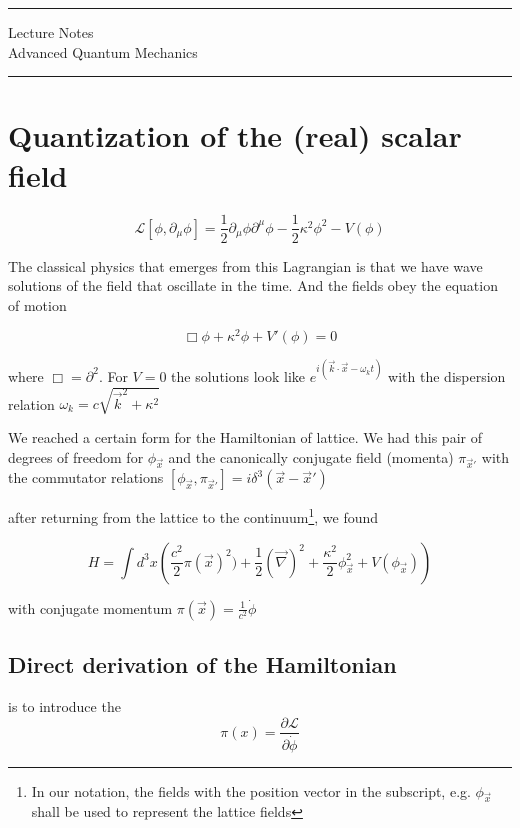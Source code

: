 \documentclass[11pt]{article}
\author{Aayush Arya}
\title{}
\date{\today}
\newcommand{\lag}{\mathcal{L}}
\begin{document}
	\maketitle
	{
	}
	\hrule
	\begin{center}
		Lecture Notes\\
		Advanced Quantum Mechanics
	\end{center}
	\hrule
	
	\section*{Quantization of the (real) scalar field}
	
	\[ \lag[\phi, \partial_\mu \phi] = \frac{1}{2} \partial_\mu \phi \partial^\mu \phi - \frac{1}{2}\kappa^2\phi^2 - V(\phi)   \]
	
	The classical physics that emerges from this Lagrangian is that we have wave solutions of the field that oscillate in the time. And the fields obey the equation of motion
	
	\[ \Box \phi + \kappa^2\phi + V'(\phi) = 0\]
	
	where $\Box = \partial^2$. For $V = 0$ the solutions look like $e^{i(\vec{k}\cdot \vec{x} - \omega_kt)}$ with the dispersion relation $\omega_k = c\sqrt{\vec{k}^2 + \kappa^2}$
		
		
		We reached a certain form for the Hamiltonian of lattice. We had this pair of degrees of freedom for $\phi_{\vec{x}}$ and the canonically conjugate field (momenta) $\pi_{\vec{x}'}$ with the commutator relations $[\phi_{\vec{x}}, \pi_{\vec{x}'}] = i\delta^3(\vec{x} -\vec{x}')$
			
			after returning from the lattice to the continuum\footnote{In our notation, the fields with the position vector in the subscript, e.g. $\phi_{\vec{x}}$ shall be used to represent the lattice fields}, we found
			
			\[ H= \int d^3 x \left( \frac{c^2}{2} \pi(\vec{x})^2) + \frac{1}{2}(\vec{\nabla})^2 + \frac{\kappa^2}{2}\phi_{\vec{x}}^2 + V(\phi_{\vec{x}}) \right)\]
			
			
			with conjugate momentum $\pi(\vec{x}) = \frac{1}{c^2}\dot{\phi}$
			
			\subsection*{Direct derivation of the Hamiltonian} is to introduce the \[\pi(x) = \frac{\partial \lag}{\partial \dot{\phi}}\]
			
\end{document}
